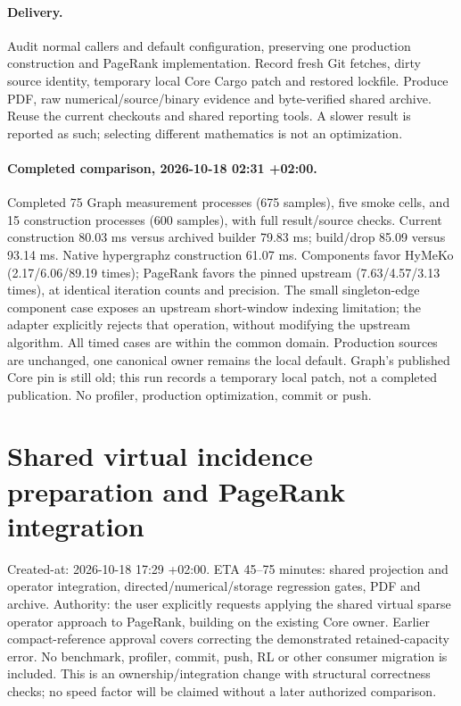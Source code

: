 \documentclass[11pt,a4paper]{article}
\begin{document}
\paragraph{Delivery.} Audit normal callers and default configuration, preserving
one production construction and PageRank implementation. Record fresh Git fetches,
dirty source identity, temporary local Core Cargo patch and restored lockfile.
Produce PDF, raw numerical/source/binary evidence and byte-verified shared archive.
Reuse the current checkouts and shared reporting tools. A slower result is reported
as such; selecting different mathematics is not an optimization.


\paragraph{Completed comparison, 2026-10-18 02:31 +02:00.}
Completed 75 Graph measurement processes (675 samples), five smoke cells,
and 15 construction processes (600 samples), with full result/source checks.
Current construction 80.03 ms versus archived builder 79.83 ms; build/drop
85.09 versus 93.14 ms. Native hypergraphz construction 61.07 ms. Components
favor HyMeKo (2.17/6.06/89.19 times); PageRank favors the pinned upstream
(7.63/4.57/3.13 times), at identical iteration counts and precision.
The small singleton-edge component case exposes an upstream short-window
indexing limitation; the adapter explicitly rejects that operation, without
modifying the upstream algorithm. All timed cases are within the common domain.
Production sources are unchanged, one canonical owner remains the local default.
Graph's published Core pin is still old; this run records a temporary local patch,
not a completed publication. No profiler, production optimization, commit or push.


\newpage\section*{Shared virtual incidence preparation and PageRank integration}
Created-at: 2026-10-18 17:29 +02:00. ETA 45--75 minutes: shared projection and
operator integration, directed/numerical/storage regression gates, PDF and archive.
Authority: the user explicitly requests applying the shared virtual sparse
operator approach to PageRank, building on the existing Core owner. Earlier
compact-reference approval covers correcting the demonstrated retained-capacity
error. No benchmark, profiler, commit, push, RL or other consumer migration is
included. This is an ownership/integration change with structural correctness
checks; no speed factor will be claimed without a later authorized comparison.
\end{document}
